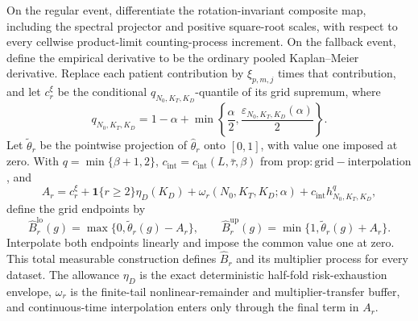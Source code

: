 On the regular event, differentiate the rotation-invariant composite map, including the spectral projector and positive square-root scales, with respect to every cellwise product-limit counting-process increment. On the fallback event, define the empirical derivative to be the ordinary pooled Kaplan--Meier derivative. Replace each patient contribution by \(\xi_{p,m,j}\) times that contribution, and let \(c_r^\xi\) be the conditional \(q_{N_0,K_T,K_D}\)-quantile of its grid supremum, where
\[
 q_{N_0,K_T,K_D}=1-\alpha+
 \min\left\{\frac{\alpha}{2},\frac{\varepsilon_{N_0,K_T,K_D}(\alpha)}{2}\right\}.
\]
Let \(\widetilde\theta_r\) be the pointwise projection of \(\widehat\theta_r\) onto \([0,1]\), with value one imposed at zero. With \(q=\min\{\beta+1,2\}\), \(c_{\mathrm{int}}=c_{\mathrm{int}}(L,\bar\tau,\beta)\) from \(\mathrm{prop:grid-interpolation}\), and
\[
 A_r=c_r^\xi+\mathbf 1\{r\ge2\}\eta_D(K_D)
     +\omega_r(N_0,K_T,K_D;\alpha)
     +c_{\mathrm{int}}h_{N_0,K_T,K_D}^{q},
\]
define the grid endpoints by
\[
 \widehat B_r^{\mathrm{lo}}(g)=\max\{0,\widetilde\theta_r(g)-A_r\},
 \qquad
 \widehat B_r^{\mathrm{up}}(g)=\min\{1,\widetilde\theta_r(g)+A_r\}.
\]
Interpolate both endpoints linearly and impose the common value one at zero. This total measurable construction defines \(\widehat B_r\) and its multiplier process for every dataset. The allowance \(\eta_D\) is the exact deterministic half-fold risk-exhaustion envelope, \(\omega_r\) is the finite-tail nonlinear-remainder and multiplier-transfer buffer, and continuous-time interpolation enters only through the final term in \(A_r\).